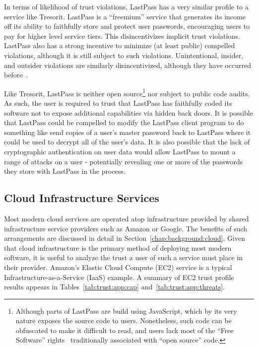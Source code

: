 In terms of likelihood of trust violations, LastPass has a very
similar profile to a service like Tresorit. LastPass is a ``freemium''
service that generates its income off its ability to faithfully store
and protect user passwords, encouraging users to pay for higher level
service tiers. This disincentivizes implicit trust
violations. LastPass also has a strong incentive to minimize (at least
public) compelled violations, although it is still subject to such
violations. Unintentional, insider, and outsider violations are
similarly disincentivized, although they have occurred
before~\cite{lastpass-blog-breach}.

Like Tresorit, LastPass is neither open source\footnote{Although parts
  of LastPass are build using JavaScript, which by its very nature
  exposes the source code to users. Nonetheless, such code can be
  obfuscated to make it difficult to read, and users lack most of the
  ``Free Software'' rights~\cite{fsf-freedoms} traditionally
  associated with ``open source'' code.} nor subject to public code
audits. As such, the user is required to trust that LastPass has
faithfully coded its software not to expose additional capabilities
via hidden back doors. It is possible that LastPass could be compelled
to modify the LastPass client program to do something like send copies
of a user's master password back to LastPass where it could be used to
decrypt all of the user's data. It is also possible that the lack of
cryptographic authentication on user data would allow LastPass to
mount a range of attacks on a user - potentially revealing one or more
of the passwords they store with LastPass in the process.

\subsection{Cloud Infrastructure Services}

Most modern cloud services are operated atop infrastructure provided
by shared infrastructure service providers such as Amazon or
Google. The benefits of such arrangements are discussed in detail in
Section~\ref{chap:background:cloud}. Given that cloud infrastructure
is the primary method of deploying most modern software, it is useful
to analyze the trust a user of such a service must place in their
provider. Amazon's Elastic Cloud Compute (EC2) service is a typical
Infrastructure-as-a-Service (IaaS) example. A summary of EC2 trust
profile results appears in Tables~\ref{tab:trust:app:cap}
and~\ref{tab:trust:app:threats}.

